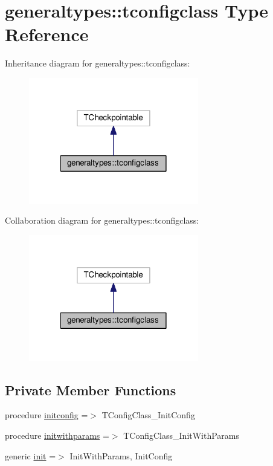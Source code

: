 \hypertarget{structgeneraltypes_1_1tconfigclass}{}\section{generaltypes\+:\+:tconfigclass Type Reference}
\label{structgeneraltypes_1_1tconfigclass}


Inheritance diagram for generaltypes\+:\+:tconfigclass\+:
\nopagebreak
\begin{figure}[H]
\begin{center}
\leavevmode
\includegraphics[width=210pt]{structgeneraltypes_1_1tconfigclass__inherit__graph}
\end{center}
\end{figure}


Collaboration diagram for generaltypes\+:\+:tconfigclass\+:
\nopagebreak
\begin{figure}[H]
\begin{center}
\leavevmode
\includegraphics[width=210pt]{structgeneraltypes_1_1tconfigclass__coll__graph}
\end{center}
\end{figure}
\subsection*{Private Member Functions}
\begin{DoxyCompactItemize}
\item 
procedure \mbox{\hyperlink{structgeneraltypes_1_1tconfigclass_a4bf7cbae5c886d40305821fb8c5e9e14}{initconfig}} =$>$ T\+Config\+Class\+\_\+\+Init\+Config
\item 
procedure \mbox{\hyperlink{structgeneraltypes_1_1tconfigclass_a0a324f31533e7ba7bace5fe4366d77cb}{initwithparams}} =$>$ T\+Config\+Class\+\_\+\+Init\+With\+Params
\item 
generic \mbox{\hyperlink{structgeneraltypes_1_1tconfigclass_a3c46715e304edeb37eb34316cef49c29}{init}} =$>$ Init\+With\+Params, Init\+Config
\end{DoxyCompactItemize}
